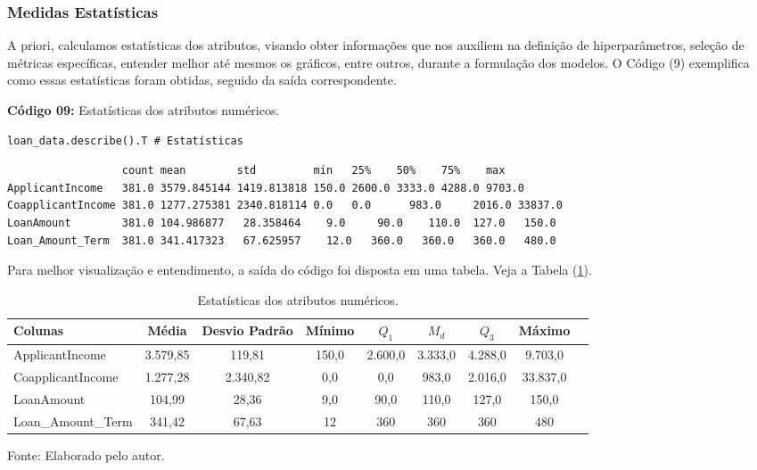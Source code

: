 \documentclass[a4paper,12pt]{article} %
\begin{document}
\subsubsection{Medidas Estatísticas}
A priori, calculamos estatísticas dos atributos, visando obter informações que nos auxiliem na definição de hiperparâmetros, seleção de métricas específicas,  entender melhor até mesmos os gráficos, entre outros, durante a formulação dos modelos. O Código (9) exemplifica como essas estatísticas foram obtidas, seguido da saída correspondente.
\begin{center}
\textbf{Código 09:} Estatísticas dos atributos numéricos.
\begin{verbatim}
loan_data.describe().T # Estatísticas
\end{verbatim}
\end{center}
{\small
\begin{verbatim}
                  count mean        std         min   25%    50%    75%    max
ApplicantIncome   381.0 3579.845144 1419.813818 150.0 2600.0 3333.0 4288.0 9703.0
CoapplicantIncome 381.0	1277.275381	2340.818114	0.0	  0.0	   983.0	 2016.0	33837.0
LoanAmount        381.0	104.986877	 28.358464	  9.0	  90.0	  110.0	 127.0	 150.0
Loan_Amount_Term  381.0	341.417323	 67.625957	  12.0	 360.0	 360.0	 360.0	 480.0
\end{verbatim}
}

Para melhor visualização e entendimento, a saída do código foi disposta em uma tabela. Veja a Tabela (\ref{tab:1}).
\begin{table}[H]
    \centering
    \caption{Estatísticas dos atributos numéricos.}
    {\small
    \begin{tabular}{lcccccccc} \\ \hline
        \small Colunas &  Média & Desvio Padrão & Mínimo & $Q_1$ & $M_d$ & $Q_3$ & Máximo  \\ \hline
        ApplicantIncome & 3.579,85 & 119,81 & 150,0 & 2.600,0 & 3.333,0 & 4.288,0 & 9.703,0 \\
        CoapplicantIncome & 1.277,28 & 2.340,82 & 0,0 & 0,0 & 983,0 & 2.016,0 & 33.837,0 \\
        LoanAmount & 104,99 & 28,36 & 9,0 & 90,0 & 110,0 & 127,0 & 150,0 \\
        Loan\_Amount\_Term & 341,42 & 67,63 & 12 & 360 & 360 & 360 & 480 \\
        \hline\hline
    \end{tabular}
    }
    Fonte: Elaborado pelo autor.
    \label{tab:1}
\end{table}
\end{document}
